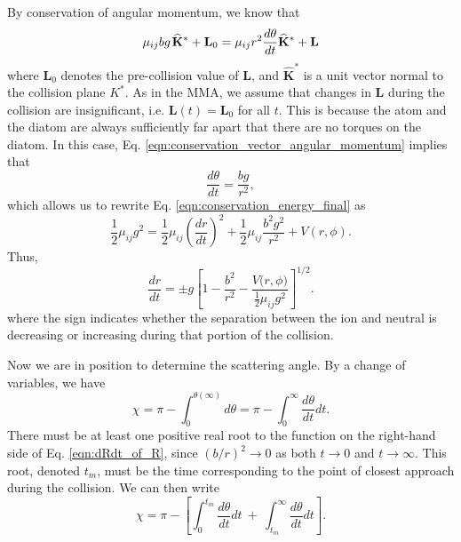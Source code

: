 \documentclass[article]{revtex4-2}
\begin{document}
By conservation of angular momentum, we know that 
\begin{equation}
    \mu_{ij}bg \mkern2mu \mathbf{\widehat{K}}^* + \mathbf{L}_{0} =\mu_{ij}r^2\frac{d\theta}{dt}\mathbf{\widehat{K}}^* + \mathbf{L}
    \label{eqn:conservation_vector_angular_momentum}
\end{equation}
where $\mathbf{L}_{0}$ denotes the pre-collision value of $\mathbf{L}$, and $\mathbf{\widehat{K}}^*$ is a unit vector normal to the collision plane $K^*$. As in the MMA, we assume that changes in $\mathbf{L}$ during the collision are insignificant, i.e. $\mathbf{L}(t) = \mathbf{L}_0$ for all $t$. 
This is because the atom and the diatom are always sufficiently far apart that there are no torques on the diatom.
In this case, Eq. \ref{eqn:conservation_vector_angular_momentum} implies that
\begin{equation}
   \frac{d\theta}{dt}= \frac{bg}{r^2},
   \label{eqn:Conservation of Angula Momentum}
\end{equation}
which allows us to rewrite Eq. \ref{eqn:conservation_energy_final} as
\begin{equation}
    \frac{1}{2}\mu_{ij}g^2 = \frac{1}{2}\mu_{ij}\left(\frac{dr}{dt}\right)^2 + \frac{1}{2}\mu_{ij}\frac{b^2g^2}{r^2} + V(r, \phi).
\end{equation}
Thus,
\begin{equation}
    \frac{dr}{dt} = \pm g\left[ 1 - \frac{b^2}{r^2} - \frac{V\big(r, \phi\big)}{\frac{1}{2}\mu_{ij} g^2}\right]^{1/2}.
    \label{eqn:dRdt_of_R}
\end{equation}
where the sign indicates whether the separation between the ion and neutral is decreasing or increasing during that portion of the collision.

Now we are in position to determine the scattering angle. By a change of variables, we have
\begin{equation}
   \chi=\pi-\int_0^{\theta( \infty)} d\theta=\pi-\int_{0}^{\infty} \frac{d \theta }{dt} dt.
\end{equation}
There must be at least one positive real root to the function on the right-hand side of Eq. \ref{eqn:dRdt_of_R}, since $(b/r)^2 \rightarrow 0$ as both $t\rightarrow 0$ and $t\rightarrow \infty$. This root, denoted $t_m$, must be the time corresponding to the point of closest approach during the collision. We can then write
\begin{equation}
    \chi = \pi - \left[ \int_{0}^{t_m}\!\frac{d \theta }{dt}dt \ + \  \int_{t_m}^{\infty}\!\frac{d \theta }{dt}dt\right].
    \label{eqn:chi_dtheta}
\end{equation}
\end{document}
